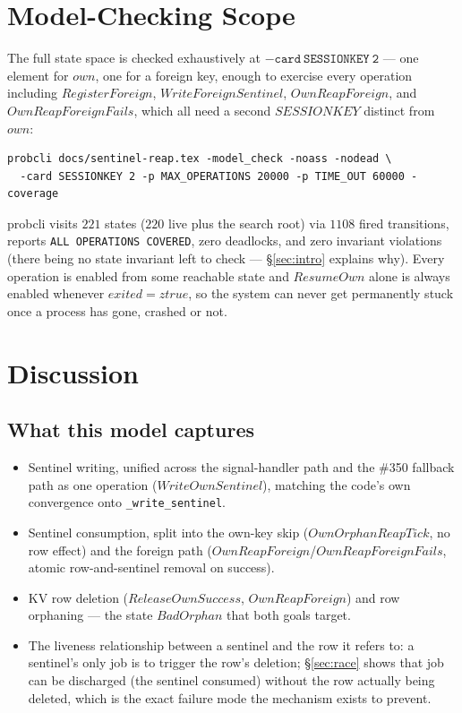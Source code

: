 \documentclass[a4paper,10pt,fleqn]{article}
\begin{document}
\section{Model-Checking Scope}

The full state space is checked exhaustively at $\mathtt{-card\
SESSIONKEY\ 2}$ --- one element for $own$, one for a foreign key,
enough to exercise every operation including $RegisterForeign$,
$WriteForeignSentinel$, $OwnReapForeign$, and
$OwnReapForeignFails$, which all need a second $SESSIONKEY$ distinct
from $own$:

\begin{verbatim}
probcli docs/sentinel-reap.tex -model_check -noass -nodead \
  -card SESSIONKEY 2 -p MAX_OPERATIONS 20000 -p TIME_OUT 60000 -coverage
\end{verbatim}

probcli visits $221$ states ($220$ live plus the search root) via
$1108$ fired transitions, reports \texttt{ALL OPERATIONS COVERED}, zero
deadlocks, and zero invariant violations (there being no state
invariant left to check --- \S\ref{sec:intro} explains why).  Every
operation is enabled from some reachable state and $ResumeOwn$ alone is
always enabled whenever $exited = ztrue$, so the system can never get
permanently stuck once a process has gone, crashed or not.

\section{Discussion}

\subsection{What this model captures}

\begin{itemize}
  \item Sentinel writing, unified across the signal-handler path and
    the \#350 fallback path as one operation ($WriteOwnSentinel$),
    matching the code's own convergence onto \texttt{\_write\_sentinel}.
  \item Sentinel consumption, split into the own-key skip
    ($OwnOrphanReapTick$, no row effect) and the foreign path
    ($OwnReapForeign$/$OwnReapForeignFails$, atomic row-and-sentinel
    removal on success).
  \item KV row deletion ($ReleaseOwnSuccess$, $OwnReapForeign$) and
    row orphaning --- the state $BadOrphan$ that both goals target.
  \item The liveness relationship between a sentinel and the row it
    refers to: a sentinel's only job is to trigger the row's deletion;
    \S\ref{sec:race} shows that job can be discharged (the sentinel
    consumed) without the row actually being deleted, which is the
    exact failure mode the mechanism exists to prevent.
\end{itemize}
\end{document}
